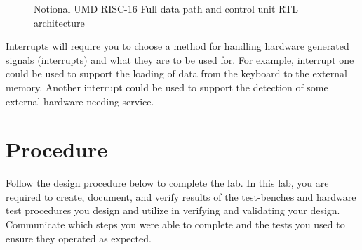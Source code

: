 \documentclass{article}
\begin{document}
\begin{figure}[!htbp]
  \centering
  \caption{Notional UMD RISC-16 Full data path and control unit RTL architecture}
  \label{fig:UMDRISCLayout}
\end{figure}
\FloatBarrier

Interrupts will require you to choose a method for handling hardware generated signals (interrupts) and what they are to be used for. For example, interrupt one could be used to support the loading of data from the keyboard to the external memory. Another interrupt could be used to support the detection of some external hardware needing service.

\section{Procedure}

Follow the design procedure below to complete the lab. In this lab, you are required to create, document, and verify results of the test-benches and hardware test procedures you design and utilize in verifying and validating your design. Communicate which steps you were able to complete and the tests you used to ensure they operated as expected.
\end{document}
